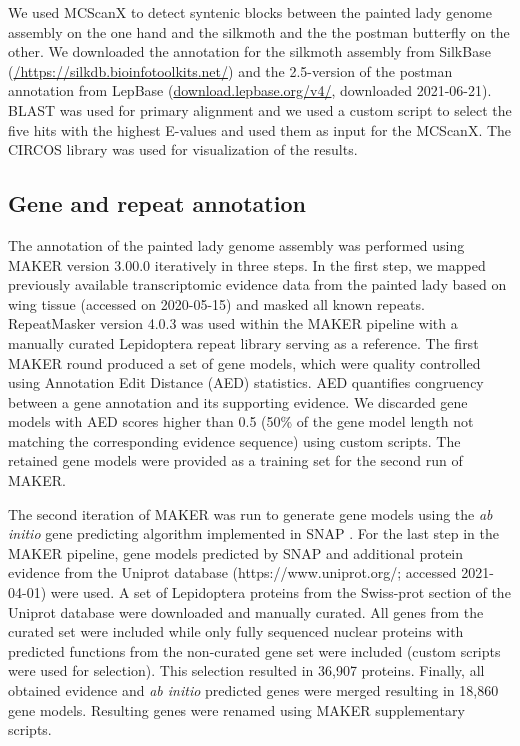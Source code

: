 \documentclass[twocolumn]{bmcart}%
\begin{document}
We used MCScanX \cite{wangMCScanXToolkitDetection2012} to detect syntenic blocks between the painted lady genome assembly on the one hand and the silkmoth and the the postman butterfly on the other. We downloaded the annotation for the silkmoth assembly from SilkBase (\href{https://silkdb.bioinfotoolkits.net}{/https://silkdb.bioi\-nfotoolkits.net/}) and the 2.5-version of the postman annotation from LepBase (\href{download.lepbase.org/v4/}{download.lepbase.org/v4/}, downloaded 2021-06-21). BLAST was used for primary alignment and we used a custom script to select the five hits with the highest E-values and used them as input for the MCScanX. The CIRCOS library \cite{krzywinskiCircosInformationAesthetic2009} was used for visualization of the results.

\subsection*{Gene and repeat annotation}
The annotation of the painted lady genome assembly was performed using MAKER version 3.00.0 \cite{holtMAKER2AnnotationPipeline2011} iteratively in three steps. In the first step, we mapped previously available transcriptomic evidence data from the painted lady based on wing tissue  \cite{connahsTranscriptomeAnalysisPainted2016a}(accessed on 2020-05-15) and masked all known repeats. RepeatMasker version 4.0.3 \cite{smitRepeatMaskerOpen42013} was used within the MAKER pipeline with a manually curated Lepidoptera repeat library  \cite{tallaRapidIncreaseGenome2017} serving as a reference. The first MAKER round produced a set of gene models, which were quality controlled using Annotation Edit Distance (AED) statistics. AED quantifies congruency between a gene annotation and its supporting evidence. We discarded gene models with AED scores higher than 0.5 (50\% of the gene model length not matching the corresponding evidence sequence) using custom scripts. The retained gene models were provided as a training set for the second run of MAKER.

The second iteration of MAKER was run to generate gene models using the \textit{ab initio} gene predicting algorithm implemented in SNAP \cite{korfGeneFindingNovel2004}. For the last step in the MAKER pipeline, gene models predicted by SNAP and additional protein evidence from the Uniprot database (https://www.uniprot.org/; accessed 2021-04-01) were used. A set of Lepidoptera proteins from the Swiss-prot section of the Uniprot database were downloaded and manually curated. All genes from the curated set were included while only fully sequenced nuclear proteins with predicted functions from the non-curated gene set were included (custom scripts were used for selection). This selection resulted in 36,907 proteins. Finally, all obtained evidence and \textit{ab initio} predicted genes were merged resulting in 18,860 gene models. Resulting genes were renamed using MAKER supplementary scripts.
\end{document}

